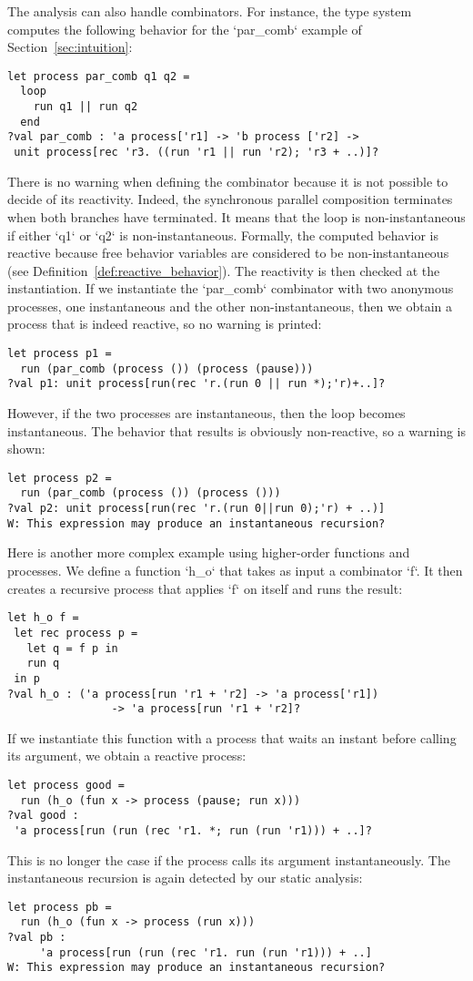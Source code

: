 \documentclass[9pt]{sigplanconf}
\begin{document}
The analysis can also handle combinators. For instance, the type system computes the following behavior for the `par_comb` example of Section~\ref{sec:intuition}:
\begin{lstlisting}
let process par_comb q1 q2 =
  loop
    run q1 || run q2
  end
?val par_comb : 'a process['r1] -> 'b process ['r2] ->
 unit process[rec 'r3. ((run 'r1 || run 'r2); 'r3 + ..)]?
\end{lstlisting}
%
There is no warning when defining the combinator because it is not possible to decide of its reactivity. Indeed, the synchronous parallel composition terminates when both branches have terminated. It means that the loop is non-instantaneous if either `q1` or `q2` is non-instantaneous. Formally, the computed behavior is reactive because free behavior variables are considered to be non-instantaneous (see Definition~\ref{def:reactive_behavior}). The reactivity is then checked at the instantiation. If we instantiate the `par_comb` combinator with two anonymous processes, one instantaneous and the other non-instantaneous, then we obtain a process that is indeed reactive, so no warning is printed:
\begin{lstlisting}
let process p1 = 
  run (par_comb (process ()) (process (pause)))
?val p1: unit process[run(rec 'r.(run 0 || run *);'r)+..]?
\end{lstlisting}
However, if the two processes are instantaneous, then the loop becomes instantaneous. The behavior that results is obviously non-reactive, so a warning is shown:
\begin{lstlisting}
let process p2 = 
  run (par_comb (process ()) (process ()))
?val p2: unit process[run(rec 'r.(run 0||run 0);'r) + ..)]
W: This expression may produce an instantaneous recursion?
\end{lstlisting}

Here is another more complex example using higher-order functions and processes. We define a function `h_o` that takes as input a combinator `f`. It then creates a recursive process that applies `f` on itself and runs the result:
\begin{lstlisting}
let h_o f =
 let rec process p =
   let q = f p in
   run q
 in p
?val h_o : ('a process[run 'r1 + 'r2] -> 'a process['r1]) 
                -> 'a process[run 'r1 + 'r2]?
\end{lstlisting}
If we instantiate this function with a process that waits an instant before calling its argument, we obtain a reactive process:
\begin{lstlisting}
let process good = 
  run (h_o (fun x -> process (pause; run x)))
?val good :
 'a process[run (run (rec 'r1. *; run (run 'r1))) + ..]?
\end{lstlisting}
This is no longer the case if the process calls its argument instantaneously. The instantaneous recursion is again detected by our static analysis:
\begin{lstlisting}
let process pb = 
  run (h_o (fun x -> process (run x)))
?val pb : 
     'a process[run (run (rec 'r1. run (run 'r1))) + ..]
W: This expression may produce an instantaneous recursion?
\end{lstlisting}
\end{document}
